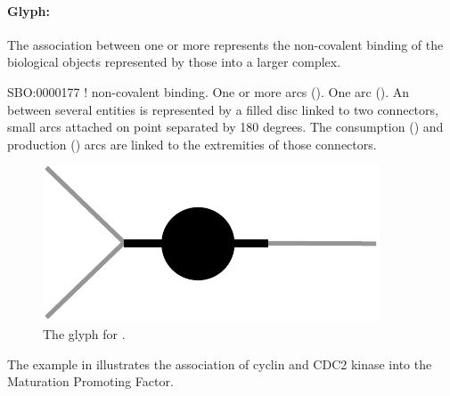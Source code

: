 
\paragraph{Glyph: }\label{sec:association}

The association between one or more  represents the non-covalent binding of the biological objects represented by those  into a larger complex.

\begin{glyphDescription}
 \glyphSboTerm SBO:0000177 ! non-covalent binding.
 \glyphOrigin One or more  arcs ().
 \glyphTarget  One  arc ().
 \glyphNode An  between several entities is represented by a filled disc linked to two connectors, small arcs attached on point separated by 180 degrees. The consumption () and production () arcs are linked to the extremities of those connectors. 
 \end{glyphDescription}

\begin{figure}[H]
  \centering
  \includegraphics[scale = 0.5]{images/association}
  \caption{The \PD glyph for .}
  \label{fig:association}
\end{figure}

The example in  illustrates the association of cyclin and CDC2 kinase into the Maturation Promoting Factor.

